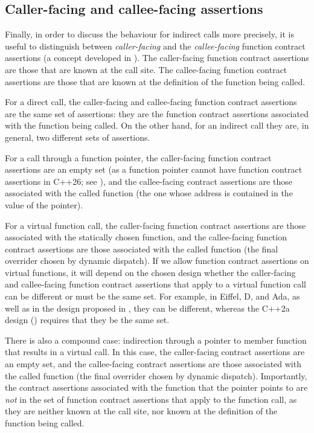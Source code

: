 \subsection{Caller-facing and callee-facing assertions}

Finally, in order to discuss the behaviour for indirect calls more precisely, it is useful to distinguish between \emph{caller-facing} and the \emph{callee-facing} function contract assertions (a concept developed in \cite{P3097R0}). The caller-facing function contract assertions are those that are known at the call site. The callee-facing function contract assertions are those that are known at the definition of the function being called.

For a direct call, the caller-facing and callee-facing function contract assertions are the same set of assertions: they are the function contract assertions associated with the function being called. On the other hand, for an indirect call they are, in general, two different sets of assertions. 

For a call through a function pointer, the caller-facing function contract assertions are an empty set (as a function pointer cannot have function contract assertions in C++26; see \cite{P3327R0}), and the callee-facing contract assertions are those associated with the called function (the one whose address is contained in the value of the pointer).

For a virtual function call, the caller-facing function contract assertions are those associated with the statically chosen function, and the callee-facing function contract assertions are those associated with the called function (the final overrider chosen by dynamic dispatch). If we allow function contract assertions on virtual functions, it will depend on the chosen design whether the caller-facing and callee-facing function contract assertions that apply to a virtual function call can be different or must be the same set. For example, in Eiffel, D, and Ada, as well as in the design proposed in \cite{P3097R0}, they can be different, whereas the C++2a design (\cite{P0542R5}) requires that they be the same set.

There is also a compound case: indirection through a pointer to member function that results in a virtual call. In this case, the caller-facing contract assertions are an empty set, and the callee-facing contract assertions are those associated with the called function (the final overrider chosen by dynamic dispatch). Importantly, the contract assertions associated with the function that the pointer points to are \emph{not} in the set of function contract assertions that apply to the function call, as they are neither known at the call site, nor known at the definition of the function being called.

